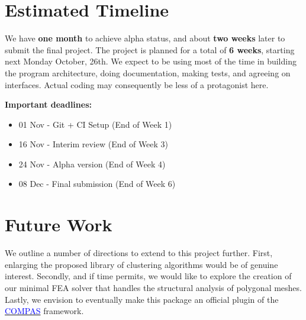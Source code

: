 \documentclass[11pt]{article}
\begin{document}
\section{Estimated Timeline}

We have \textbf{one month} to achieve alpha status, and about \textbf{two weeks} later to submit the final project. The project is planned for a total of \textbf{6 weeks}, starting next Monday October, 26th. We expect to be using most of the time in building the program architecture, doing documentation, making tests, and agreeing on interfaces. Actual coding may consequently be less of a protagonist here.

\textbf{Important deadlines:}
\begin{itemize}
    \item 01 Nov - Git + CI Setup (End of Week 1)
    \item 16 Nov - Interim review (End of Week 3)
    \item 24 Nov - Alpha version (End of Week 4)
    \item 08 Dec - Final submission (End of Week 6)
\end{itemize}

\section{Future Work}

We outline a number of directions to extend to this project further. First, enlarging the proposed library of clustering algorithms would be of genuine interest. Secondly, and if time permits, we would like to explore the creation of our minimal FEA solver that handles the structural analysis of polygonal meshes. Lastly, we envision to eventually make this package an official plugin of the \href{http://www.compas.dev}{\textcolor{blue}{COMPAS}} framework.
\end{document}
